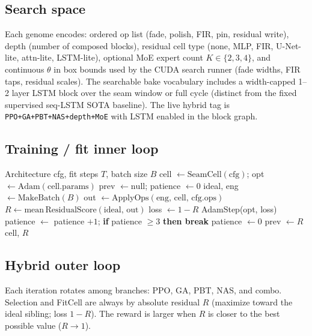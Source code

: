 \subsection{Search space}
\label{sec:search-space}

Each genome encodes: ordered op list (fade, polish, FIR, pin, residual write), depth (number of composed blocks), residual cell type (none, MLP, FIR, U-Net-lite, attn-lite, LSTM-lite), optional MoE expert count $K\in\{2,3,4\}$, and continuous $\theta$ in box bounds used by the CUDA search runner (fade widths, FIR taps, residual scales).
The searchable bake vocabulary includes a width-capped 1--2 layer LSTM block over the seam window or full cycle (distinct from the fixed supervised seq-LSTM SOTA baseline).
The live hybrid tag is \texttt{PPO+GA+PBT+NAS+depth+MoE} with LSTM enabled in the block graph.

\subsection{Training / fit inner loop}
\label{sec:fit}

\begin{algorithm}[t]
\caption{FitCell (inner loop)}
\label{alg:fit}
\begin{algorithmic}[1]
\Require Architecture cfg, fit steps $T$, batch size $B$
\State cell $\gets \mathrm{SeamCell}(\mathrm{cfg})$; opt $\gets \mathrm{Adam}(\mathrm{cell.params})$
\State prev $\gets \mathrm{null}$; patience $\gets 0$
  \State ideal, eng $\gets \mathrm{MakeBatch}(B)$
  \State out $\gets \mathrm{ApplyOps}(\mathrm{eng},\,\mathrm{cell},\,\mathrm{cfg.ops})$
  \State $R \gets \mathrm{mean}\,\mathrm{ResidualScore}(\mathrm{ideal},\,\mathrm{out})$
  \State loss $\gets 1-R$
   AdamStep(opt, loss)
  \EndIf
    \State patience $\gets$ patience $+1$; \textbf{if} patience $\ge 3$ \textbf{then break}
  \Else
    \State patience $\gets 0$
  \EndIf
  \State prev $\gets R$
\EndFor
\State \Return cell, $R$
\end{algorithmic}
\end{algorithm}

\subsection{Hybrid outer loop}
\label{sec:hybrid}

Each iteration rotates among branches: PPO, GA, PBT, NAS, and combo.
Selection and FitCell are always by absolute residual $R$ (maximize toward the ideal sibling; loss $1-R$).
The reward is larger when $R$ is closer to the best possible value ($R{\to}1$).

